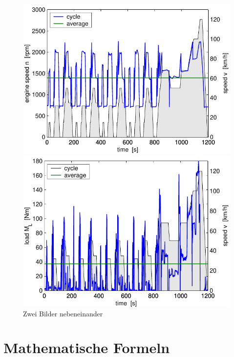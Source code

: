 \begin{figure}
  \begin{minipage}[t]{0.48\textwidth}
    \includegraphics[width = \textwidth]{images/examples/cycle_we.pdf}
  \end{minipage}
  \hfill
  \begin{minipage}[t]{0.48\textwidth}
    \includegraphics[width = \textwidth]{images/examples/cycle_ml.pdf}
  \end{minipage}
  \caption{Zwei Bilder nebeneinander}
  \label{pics:cycle}
\end{figure}


\section{Mathematische Formeln}\label{sec:math}

